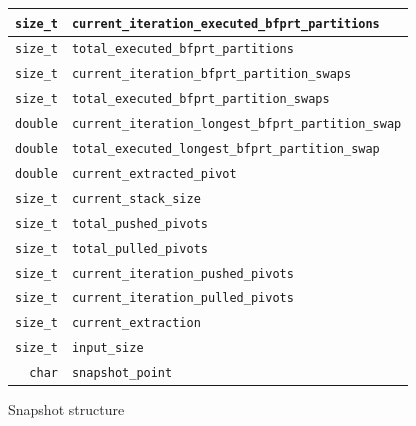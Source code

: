 \begin{figure}[!ht]
\begin{tabularx}{\linewidth}{|r|X|}
    \hline
    \texttt{size\_t} & \texttt{current\_iteration\_executed\_bfprt\_partitions} \\ %
    \hline
    \texttt{size\_t} & \texttt{total\_executed\_bfprt\_partitions} \\ %
    \hline
    \texttt{size\_t} & \texttt{current\_iteration\_bfprt\_partition\_swaps} \\ %
    \hline
    \texttt{size\_t} & \texttt{total\_executed\_bfprt\_partition\_swaps} \\ %
    \hline
    \texttt{double} & \texttt{current\_iteration\_longest\_bfprt\_partition\_swap} \\ %
    \hline
    \texttt{double} & \texttt{total\_executed\_longest\_bfprt\_partition\_swap} \\ %
    \hline
    \texttt{double} & \texttt{current\_extracted\_pivot} \\ %
    \hline
    \texttt{size\_t} & \texttt{current\_stack\_size} \\ %
    \hline
    \texttt{size\_t} & \texttt{total\_pushed\_pivots} \\ %
    \hline
    \texttt{size\_t} & \texttt{total\_pulled\_pivots} \\ %
    \hline
    \texttt{size\_t} & \texttt{current\_iteration\_pushed\_pivots} \\ %
    \hline
    \texttt{size\_t} & \texttt{current\_iteration\_pulled\_pivots} \\ %
    \hline
    \texttt{size\_t} & \texttt{current\_extraction} \\ %
    \hline
    \texttt{size\_t} & \texttt{input\_size} \\ %
    \hline
    \texttt{char} & \texttt{snapshot\_point} \\ %
    \hline
\end{tabularx}
\caption{Snapshot structure}
\label{TABLE:SNAPSHOT_STRUCTURE}
\end{figure}


